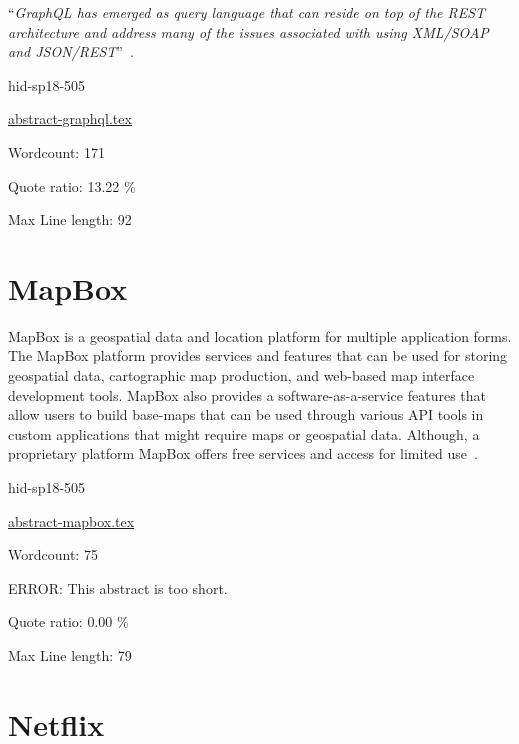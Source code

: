 \color{blue}``\emph{GraphQL has emerged as query language that can reside on top of the REST
architecture and address many of the issues associated with using XML/SOAP and
JSON/REST}''\color{black}~\cite{hid-sp18-505-GraphQL2018}.


\begin{IU}

hid-sp18-505

\href{https://github.com/cloudmesh-community/hid-sp18-505/blob/master//technology/abstract-graphql.tex}{abstract-graphql.tex}

 

Wordcount: 171


Quote ratio: 13.22 \%
 
Max Line length: 92
\end{IU}

\section{MapBox}

MapBox is a geospatial data and location platform for multiple application
forms.  The MapBox platform provides services and features that can be used for
storing geospatial data, cartographic map production, and web-based map
interface development tools.  MapBox also provides a software-as-a-service
features that allow users to build base-maps that can be used through various
API tools in custom applications that might require maps or geospatial
data.  Although, a proprietary platform MapBox offers free services and access
for limited use~\cite{hid-sp18-505-MapBox2018}.


\begin{IU}

hid-sp18-505

\href{https://github.com/cloudmesh-community/hid-sp18-505/blob/master//technology/abstract-mapbox.tex}{abstract-mapbox.tex}

 

Wordcount: 75

ERROR: This abstract is too short.


Quote ratio: 0.00 \%
 
Max Line length: 79
\end{IU}

\section{Netflix}


